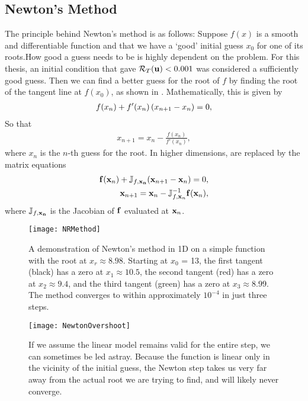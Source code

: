 \subsection{Newton's Method}
The principle behind Newton's method is as follows: Suppose  $f(x)$ is a smooth and differentiable function and that we have a `good' initial guess $x_0$ for one of its roots.{How good a guess needs to be is highly dependent on the problem. For this thesis, an initial condition that gave $\mathcal{R}_T(\mathbf{u}) < 0.001$ was considered a sufficiently good guess.}  Then we can find a better guess for the root of $f$ by finding the root of the tangent line at $f(x_0)$, as shown in . Mathematically, this is given by
\begin{align}
f(x_n) + f'(x_n)\left ( x_{n+1} - x_n \right ) = 0,\label{eq:NRS1D}
\end{align}
So that
\begin{align}
x_{n+1} = x_n - \frac{f(x_n)}{f'(x_n)},\label{eq:NR1D}
\end{align}
where $x_n$ is the $n$-th guess for the root. In higher dimensions,  are replaced by the matrix equations
\begin{align}
\mathbf{f}(\mathbf{x}_n) + \mathbb{J}_{f,\mathbf{x_n}}(\mathbf{x}_{n+1} - \mathbf{x}_n) = 0,\label{eq:NRSND}\\
\mathbf{x}_{n+1} = \mathbf{x}_n - \mathbb{J}_{f,\mathbf{x}_n}^{-1}\mathbf{f}(\mathbf{x}_n),
\end{align}
where $\mathbb{J}_{f,\mathbf{x_n}}$ is the Jacobian of $\mathbf{f}$ evaluated at $\mathbf{x}_n$.\\

\begin{figure}[h]
\texttt{[image: NRMethod]}
\caption{A demonstration of Newton's method in 1D on a simple function with the root at $x_r \approx 8.98$. Starting at $x_0$ = 13, the first tangent (black) has a zero at $x_1 \approx 10.5$, the second tangent (red) has a zero at $x_2 \approx 9.4$, and the third tangent (green) has a zero at $x_3 \approx 8.99$. The method converges to within approximately $10^{-4}$ in just three steps.}\label{fig:Newton}
\end{figure}  

  \begin{figure}[h]
 \texttt{[image: NewtonOvershoot]}
 \caption{If we assume the linear model remains valid for the entire step, we can sometimes be led astray. Because the function is linear only in the vicinity of the initial guess, the Newton step takes us very far away from the actual root we are trying to find, and will likely never converge.}\label{fig:NewtonOvershoot}
 \end{figure}
 

